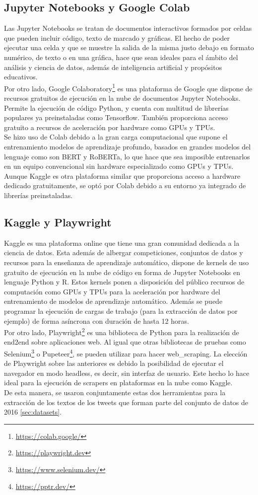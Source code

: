 \subsection{Jupyter Notebooks y Google Colab}
Las Jupyter Notebooks se tratan de documentos interactivos formados por celdas que pueden incluir código, texto de marcado y gráficas. El hecho de poder ejecutar una celda y que se muestre la salida de la misma justo debajo en formato numérico, de texto o en una gráfica, hace que sean ideales para el ámbito del análisis y ciencia de datos, además de inteligencia artificial y propósitos educativos.\\
Por otro lado, Google Colaboratory\footnote{\url{https://colab.google/}} es una plataforma de Google que dispone de recursos gratuitos de ejecución en la nube de documentos Jupyter Notebooks. Permite la ejecución de código Python, y cuenta con multitud de librerías populares ya preinstaladas como Tensorflow. También proporciona acceso gratuito a recursos de aceleración por hardware como GPUs y TPUs.\\
Se hizo uso de Colab debido a la gran carga computacional que supone el entrenamiento modelos de aprendizaje profundo, basados en grandes modelos del lenguaje como son BERT y RoBERTa, lo que hace que sea imposible entrenarlos en un equipo convencional sin hardware especializado como GPUs y TPUs. Aunque Kaggle es otra plataforma similar que proporciona acceso a hardware dedicado gratuitamente, se optó por Colab debido a su entorno ya integrado de librerías preinstaladas.
\subsection{Kaggle y Playwright}
Kaggle es una plataforma online que tiene una gran comunidad dedicada a la ciencia de datos. Esta además de albergar competiciones, conjuntos de datos y recursos para la enseñanza de aprendizaje automático, dispone de kernels de uso gratuito de ejecución en la nube de código en forma de Jupyter Notebooks en lenguaje Python y R. Estos kernels ponen a disposición del público recursos de computación como GPUs y TPUs para la aceleración por hardware del entrenamiento de modelos de aprendizaje automático. Además se puede programar la ejecución de cargas de trabajo (para la extracción de datos por ejemplo) de forma asíncrona con duración de hasta 12 horas.\\
Por otro lado, Playwright\footnote{\url{https://playwright.dev}} es una biblioteca de Python para la realización de \gls{end2end} sobre aplicaciones web. Al igual que otras bibliotecas de pruebas como Selenium\footnote{\url{https://www.selenium.dev/}} o Pupeteer\footnote{\url{https://pptr.dev/}}, se pueden utilizar para hacer \gls{web_scraping}. La elección de Playwright sobre las anteriores es debido la posibilidad de ejecutar el navegador en modo headless, es decir, sin interfaz de usuario. Este hecho lo hace ideal para la ejecución de scrapers en plataformas en la nube como Kaggle.\\
De esta manera, se usaron conjuntamente estas dos herramientas para la extracción de los textos de los tweets que forman parte del conjunto de datos de 2016 \ref{sec:datasets}.
